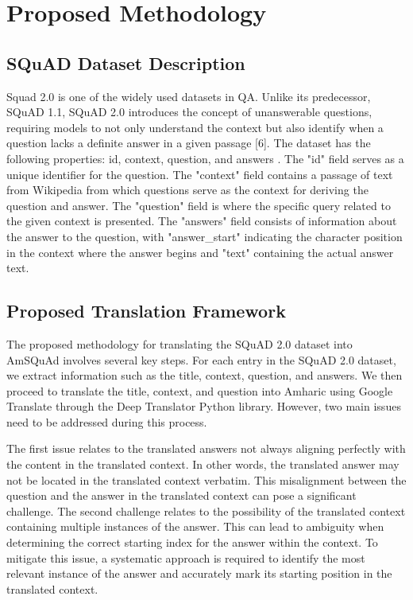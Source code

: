 \section{Proposed Methodology}
\subsection{SQuAD Dataset Description}
Squad 2.0 is one of the widely used datasets in QA. Unlike its predecessor, SQuAD 1.1, SQuAD 2.0 introduces the concept of unanswerable questions, requiring models to not only understand the context but also identify when a question lacks a definite answer in a given passage [6]. The dataset has the following properties: id, context, question, and answers \cite{squad_v2_huggingface}. The "id" field serves as a unique identifier for the question. The "context" field contains a passage of text from Wikipedia from which questions serve as the context for deriving the question and answer. The "question" field is where the specific query related to the given context is presented. The "answers" field consists of information about the answer to the question, with "answer\_start" indicating the character position in the context where the answer begins and "text" containing the actual answer text.

\subsection{Proposed Translation Framework}
The proposed methodology for translating the SQuAD 2.0 dataset into AmSQuAd involves several key steps. For each entry in the SQuAD 2.0 dataset, we extract information such as the title, context, question, and answers. We then proceed to translate the title, context, and question into Amharic using Google Translate through the Deep Translator Python library. However, two main issues need to be addressed during this process.  

The first issue relates to the translated answers not always aligning perfectly with the content in the translated context. In other words, the translated answer may not be located in the translated context verbatim. This misalignment between the question and the answer in the translated context can pose a significant challenge.  The second challenge relates to the possibility of the translated context containing multiple instances of the answer. This can lead to ambiguity when determining the correct starting index for the answer within the context. To mitigate this issue, a systematic approach is required to identify the most relevant instance of the answer and accurately mark its starting position in the translated context.  

